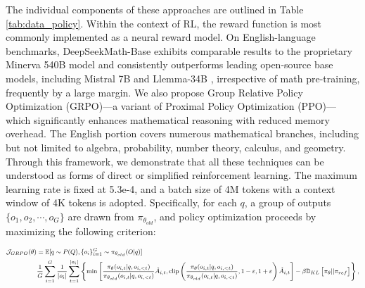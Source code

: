The individual components of these approaches are outlined in Table \ref{tab:data_policy}. Within the context of RL, the reward function is most commonly implemented as a neural reward model. On English-language benchmarks, DeepSeekMath-Base exhibits comparable results to the proprietary Minerva 540B \citep{minerva} model and consistently outperforms leading open-source base models, including Mistral 7B \citep{mistral} and Llemma-34B \citep{llemma}, irrespective of math pre-training, frequently by a large margin. We also propose Group Relative Policy Optimization (GRPO)—a variant of Proximal Policy Optimization (PPO)—which significantly enhances mathematical reasoning with reduced memory overhead. The English portion covers numerous mathematical branches, including but not limited to algebra, probability, number theory, calculus, and geometry. Through this framework, we demonstrate that all these techniques can be understood as forms of direct or simplified reinforcement learning. The maximum learning rate is fixed at 5.3e-4, and a batch size of 4M tokens with a context window of 4K tokens is adopted. Specifically, for each $q$, a group of outputs $\{o_1, o_2, \cdots, o_G\}$ are drawn from $\pi_{\theta_{old}}$, and policy optimization proceeds by maximizing the following criterion:

\begin{equation}
\footnotesize
\begin{split}
    \mathcal{J}_{GRPO}(\theta) &= \mathbb{E}{[q \sim P(Q), \{o_i\}_{i=1}^G \sim \pi_{\theta_{old}}(O|q)]}  \\
    & \frac{1}{G}\sum_{i=1}^G\frac{1}{|o_i|} \sum_{t=1}^{|o_i|} \left\{ \min \left[ \frac{\pi_\theta(o_{i,t} | q, o_{i,<t})}{\pi_{\theta_{old}}(o_{i,t} | q, o_{i,<t})} \hat{A}_{i,t}, \text{clip} \left( \frac{\pi_\theta(o_{i,t} | q, o_{i,<t})}{\pi_{\theta_{old}}(o_{i,t} | q, o_{i,<t})}, 1 - \varepsilon, 1 + \varepsilon \right)  \hat{A}_{i,t} \right] - \beta \mathbb{D}_{KL}\left[\pi_{\theta} || \pi_{ref}\right]\right\} ,
\end{split}
\label{eq:GRPO-obj}
\end{equation}

